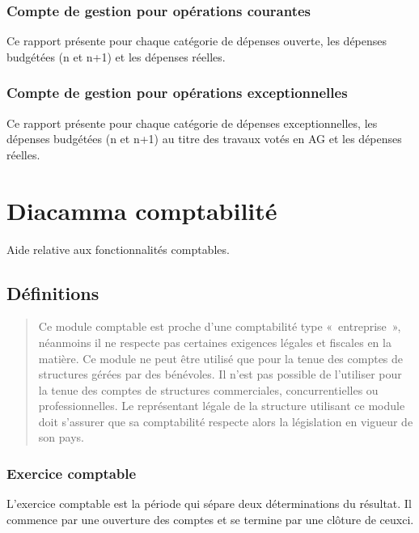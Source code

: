 \documentclass[a4paper,10pt,oneside,french]{sphinxmanual}
\begin{document}
\subsection{Compte de gestion pour opérations courantes}
\label{\detokenize{condominium/report:compte-de-gestion-pour-operations-courantes}}
\sphinxAtStartPar
Ce rapport présente pour chaque catégorie de dépenses ouverte, les dépenses budgétées (n et n+1) et les dépenses
réelles.


\subsection{Compte de gestion pour opérations exceptionnelles}
\label{\detokenize{condominium/report:compte-de-gestion-pour-operations-exceptionnelles}}
\sphinxAtStartPar
Ce rapport présente pour chaque catégorie de dépenses exceptionnelles, les dépenses budgétées (n et n+1) au titre
des travaux votés en AG et les dépenses réelles.


\chapter{Diacamma comptabilité}
\label{\detokenize{accounting/index:diacamma-comptabilite}}\label{\detokenize{accounting/index::doc}}
\sphinxAtStartPar
Aide relative aux fonctionnalités comptables.


\section{Définitions}
\label{\detokenize{accounting/definition:definitions}}\label{\detokenize{accounting/definition::doc}}\begin{quote}

\sphinxAtStartPar
{} Ce module comptable est proche d’une comptabilité type « entreprise », néanmoins il ne respecte pas certaines exigences légales et fiscales en la matière.
Ce module ne peut être utilisé que pour la tenue des comptes de structures gérées par des bénévoles. Il n’est pas possible de l’utiliser pour la tenue des comptes de structures commerciales, concurrentielles ou professionnelles.
Le représentant légale de la structure utilisant ce module doit s’assurer que sa comptabilité respecte alors la législation en vigueur de son pays.
\end{quote}


\subsection{Exercice comptable}
\label{\detokenize{accounting/definition:exercice-comptable}}
\sphinxAtStartPar
L’exercice comptable est la période qui sépare deux déterminations du résultat. Il commence par une ouverture des comptes et se termine par une clôture de ceux\sphinxhyphen{}ci.
\end{document}
